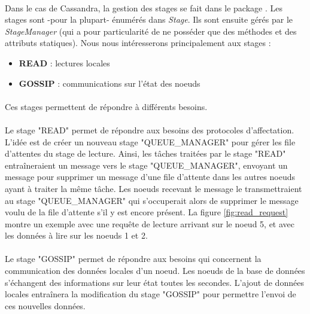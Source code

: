 \documentclass[12pt]{article}
\begin{document}
\paragraph{} Dans le cas de Cassandra, la gestion des stages se fait dans le package . Les stages sont -pour la plupart- énumérés dans \textit{Stage}. Ils sont ensuite gérés par le \textit{StageManager} (qui a pour particularité de ne posséder que des méthodes et des attributs statiques). Nous nous intéresserons principalement aux stages :

\begin{itemize}
	\item \textbf{READ} : lectures locales
	\item \textbf{GOSSIP} : communications sur l'état des noeuds
\end{itemize}
\paragraph{} Ces stages permettent de répondre à différents besoins.

\paragraph{} Le stage "READ" permet de répondre aux besoins des protocoles d'affectation. L'idée est de créer un nouveau stage "QUEUE\_MANAGER" pour gérer les file d'attentes du stage de lecture. Ainsi, les tâches traitées par le stage "READ" entraîneraient un message vers le stage "QUEUE\_MANAGER", envoyant un message pour supprimer un message d'une file d'attente dans les autres noeuds ayant à traiter la même tâche. Les noeuds recevant le message le transmettraient au stage "QUEUE\_MANAGER" qui s'occuperait alors de supprimer le message voulu de la file d'attente s'il y est encore présent. La figure \ref{fig:read_request} montre un exemple avec une requête de lecture arrivant sur le noeud 5, et avec les données à lire sur les noeuds 1 et 2.

\paragraph{} Le stage "GOSSIP" permet de répondre aux besoins qui concernent la communication des données locales d'un noeud. Les noeuds de la base de données s'échangent des informations sur leur état toutes les secondes. L'ajout de données locales entraînera la modification du stage "GOSSIP" pour permettre l'envoi de ces nouvelles données.
\end{document}
